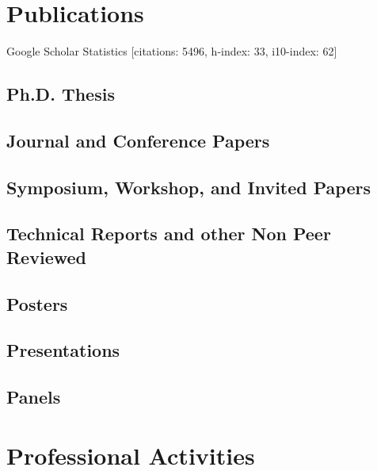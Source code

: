 \documentclass{article}
\begin{document}
\section*{Publications}

Google Scholar Statistics [citations: 5496, h-index: 33, i10-index: 62]

\subsection*{Ph.D. Thesis}


\subsection*{Journal and Conference Papers}


\subsection*{Symposium, Workshop, and Invited Papers}


\subsection*{Technical Reports and other Non Peer Reviewed}


\subsection*{Posters}



\subsection*{Presentations}



\subsection*{Panels}



\section*{Professional Activities}
\end{document}
